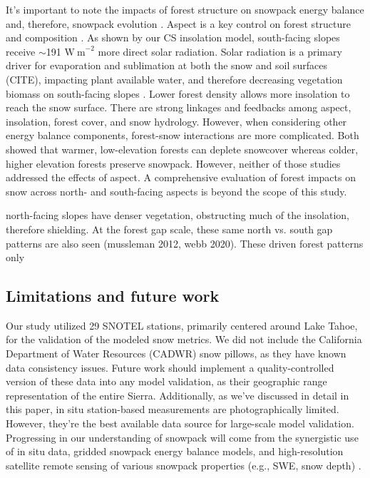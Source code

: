 It's important to note the impacts of forest structure on snowpack energy balance and, therefore, snowpack evolution \citep{rothForestImpactsSnow2017}. Aspect is a key control on forest structure and composition \citep{pelletierWhichWayYou2018a}.  As shown by our CS insolation model, south-facing slopes receive $\sim$191 $\mathrm{W~m}^{-2}$ more direct solar radiation. Solar radiation is a primary driver for evaporation and sublimation at both the snow and soil surfaces (CITE), impacting plant available water, and therefore decreasing vegetation biomass on south-facing slopes \citep{zapata-riosInfluenceTerrainAspect2016}. Lower forest density allows more insolation to reach the snow surface. There are strong linkages and feedbacks among aspect, insolation, forest cover, and snow hydrology. However, when considering other energy balance components, forest-snow interactions are more complicated.  Both \citep{lundquistLowerForestDensity2013,rothForestImpactsSnow2017} showed that warmer, low-elevation forests can deplete snowcover whereas colder, higher elevation forests preserve snowpack. However, neither of those studies addressed the effects of aspect. A comprehensive evaluation of forest impacts on snow across north- and south-facing aspects is beyond the scope of this study.


north-facing slopes have denser vegetation, obstructing much of the insolation, therefore shielding. At the forest gap scale, these same north vs. south gap patterns are also seen (mussleman 2012, webb 2020). These driven forest patterns only 


\hypertarget{ch2-discussion-1}{\subsection{Limitations and future work}\label{ch2-discussion-1}}

Our study utilized 29 SNOTEL stations, primarily centered around Lake Tahoe, for the validation of the modeled snow metrics. We did not include the California Department of Water Resources (CADWR) snow pillows, as they have known data consistency issues. Future work should implement a quality-controlled version of these data into any model validation, as their geographic range representation of the entire Sierra. Additionally, as we've discussed in detail in this paper, in situ station-based measurements are photographically limited. However, they're the best available data source for large-scale model validation. Progressing in our understanding of snowpack will come from the synergistic use of in situ data, gridded snowpack energy balance models, and high-resolution satellite remote sensing of various snowpack properties (e.g., SWE, snow depth) \citep{flemingSNOTELSoilClimate2023}.


